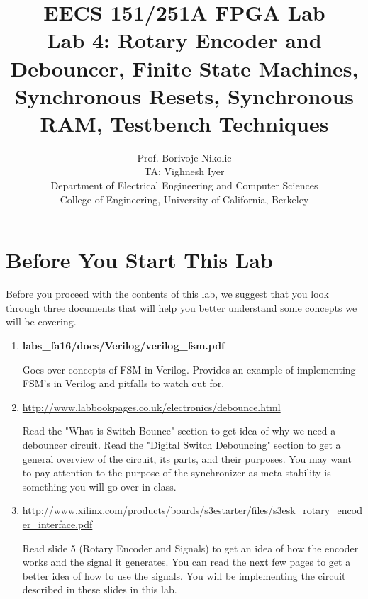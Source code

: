 \documentclass[11pt]{article}
\begin{document}
\title{EECS 151/251A FPGA Lab\\
Lab 4: Rotary Encoder and Debouncer, Finite State Machines, Synchronous Resets, Synchronous RAM, Testbench Techniques}

\author{Prof. Borivoje Nikolic \\
TA: Vighnesh Iyer \\Department of Electrical Engineering and Computer Sciences\\
College of Engineering, University of California, Berkeley}
\date{}
\maketitle

\tableofcontents

\section{Before You Start This Lab}

Before you proceed with the contents of this lab, we suggest that you look through three documents that will help you better understand some concepts we will be covering.

\begin{enumerate}
	\item \textbf{labs\_fa16/docs/Verilog/verilog\_fsm.pdf}
	
	Goes over concepts of FSM in Verilog. Provides an example of  implementing FSM's in Verilog and pitfalls to watch out for.
	
	\item \url{http://www.labbookpages.co.uk/electronics/debounce.html}
	
	Read the "What is Switch Bounce" section to get idea of why we need a debouncer circuit. Read the "Digital Switch Debouncing" section to get a general overview of the circuit, its parts, and their purposes. You may want to pay attention to the purpose of the synchronizer as meta-stability is something you will go over in class.
	
	\item \url{http://www.xilinx.com/products/boards/s3estarter/files/s3esk_rotary_encoder_interface.pdf}
	
	Read slide 5 (Rotary Encoder and Signals) to get an idea of how the encoder works and the signal it generates. You can read the next few pages to get a better idea of how to use the signals. You will be implementing the circuit described in these slides in this lab.

\end{enumerate}
\end{document}
